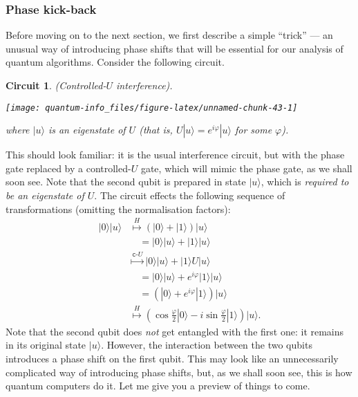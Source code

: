 \documentclass[fleqn]{article}
\newtheorem*{circuit}{Circuit}
\begin{document}
\hypertarget{phase-kick-back}{%
\subsubsection{Phase kick-back}\label{phase-kick-back}}

Before moving on to the next section, we first describe a simple ``trick'' --- an unusual way of introducing phase shifts that will be essential for our analysis of quantum algorithms.
Consider the following circuit.

\begin{circuit}

(Controlled-\(U\) interference).

\begin{center}\texttt{[image: quantum-info\_files/figure-latex/unnamed-chunk-43-1]} \end{center}

where \(|u\rangle\) is an \emph{eigenstate} of \(U\) (that is, \(U|u\rangle = e^{i\varphi}|u\rangle\) for some \(\varphi\)).

\end{circuit}

This should look familiar: it is the usual interference circuit, but with the phase gate replaced by a controlled-\(U\) gate, which will mimic the phase gate, as we shall soon see.
Note that the second qubit is prepared in state \(|u\rangle\), which is \emph{required to be an eigenstate of \(U\)}.
The circuit effects the following sequence of transformations (omitting the normalisation factors):
\[
  \begin{aligned}
    |0\rangle|u\rangle
    &\overset{H}{\longmapsto}
    (|0\rangle+|1\rangle)|u\rangle
  \\&\quad = |0\rangle|u\rangle + |1\rangle|u\rangle
  \\&\overset{\texttt{c-}U}{\longmapsto}
    |0\rangle|u\rangle + |1\rangle U|u\rangle
  \\&\quad = |0\rangle|u\rangle + e^{i\varphi}|1\rangle|u\rangle
  \\&\quad = (|0\rangle + e^{i\varphi}|1\rangle) |u\rangle
  \\&\overset{H}{\longmapsto}
    \left(
      \cos\frac{\varphi}{2}|0\rangle
      - i\sin\frac{\varphi}{2}|1\rangle
    \right) |u\rangle.
  \end{aligned}
\]
Note that the second qubit does \emph{not} get entangled with the first one: it remains in its original state \(|u\rangle\).
However, the interaction between the two qubits introduces a phase shift on the first qubit.
This may look like an unnecessarily complicated way of introducing phase shifts, but, as we shall soon see, this is how quantum computers do it.
Let me give you a preview of things to come.
\end{document}
